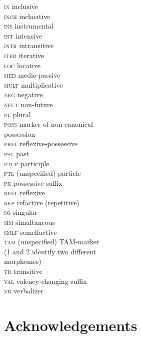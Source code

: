 \documentclass[output=paper,colorlinks,citecolor=brown]{langscibook}
\begin{document}
\begin{multicols}{2}
\begin{tabbing}
\textsc{in}         \> inclusive\\
\textsc{inch}       \> inchoative\\
\textsc{ins}        \> instrumental\\
\textsc{int}        \> intensive\\
\textsc{intr}       \> intransitive\\
\textsc{iter}       \> iterative\\
\textsc{loc}        \> locative\\
\textsc{med}        \> medio-passive\\
\textsc{mult}       \> multiplicative\\
\textsc{neg}        \> negative\\
\textsc{nfut}       \> non-future\\
\textsc{pl}         \> plural\\
\textsc{poss}       \> marker of non-canonical \\
                    \> possession\\
\textsc{prfl}       \> reflexive-possessive\\
\textsc{pst}        \> past\\
\textsc{ptcp}       \> participle\\
\textsc{ptl}        \> (unspecified) particle\\
\textsc{px}         \> possessive suffix\\
\textsc{refl}       \> reflexive\\
\textsc{rep}        \> refactive (repetitive)\\
\textsc{sg}         \> singular\\
\textsc{sim}        \> simultaneous\\
\textsc{smlf}       \> semelfactive\\
\textsc{tam}        \> (unspecified) TAM-marker\\
                    \> (1 and 2 identify two different \\ \> morphemes)\\
\textsc{tr}         \> transitive\\
\textsc{val}        \> valency-changing suffix\\
\textsc{vr}         \> verbalizer\\
\end{tabbing}
\end{multicols}

\section*{Acknowledgements}
\end{document}
